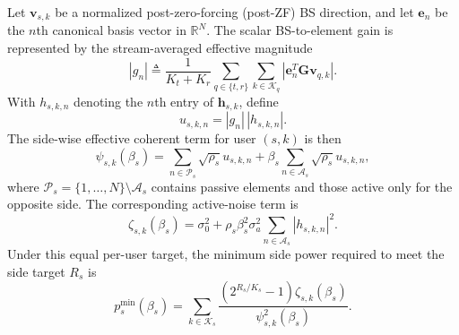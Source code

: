 \documentclass[journal]{IEEEtran}
\begin{document}
Let $\mathbf v_{s,k}$ be a normalized post-zero-forcing (post-ZF) BS direction, and let $\mathbf e_n$ be the $n$th canonical basis vector in $\mathbb{R}^N$. The scalar BS-to-element gain is represented by the stream-averaged effective magnitude
\[
|g_n|\triangleq \frac{1}{K_t+K_r}\sum_{q\in\{t,r\}}\sum_{k\in\mathcal{K}_q}\left|\mathbf e_n^T\mathbf{G}\mathbf v_{q,k}\right|.
\]
With $h_{s,k,n}$ denoting the $n$th entry of $\mathbf{h}_{s,k}$, define
\begin{equation}
u_{s,k,n} = |g_n|\,|h_{s,k,n}|.
\label{eq:un}
\end{equation}
The side-wise effective coherent term for user $(s,k)$ is then
\begin{equation}
\psi_{s,k}(\beta_s)=
\sum_{n\in\mathcal{P}_s}\sqrt{\rho_s}u_{s,k,n}
+\beta_s\sum_{n\in\mathcal{A}_s}\sqrt{\rho_s}u_{s,k,n},
\label{eq:psi}
\end{equation}
where $\mathcal{P}_s=\{1,\ldots,N\}\setminus\mathcal{A}_s$ contains passive elements and those active only for the opposite side. The corresponding active-noise term is
\begin{equation}
\zeta_{s,k}(\beta_s)=\sigma_0^2+
\rho_s\beta_s^2\sigma_a^2
\sum_{n\in\mathcal{A}_s}|h_{s,k,n}|^2.
\label{eq:noise_exact}
\end{equation}
Under this equal per-user target, the minimum side power required to meet the side target $R_s$ is
\begin{equation}
p_s^{\min}(\beta_s)=
\sum_{k\in\mathcal{K}_s}
\frac{(2^{R_s/K_s}-1)\zeta_{s,k}(\beta_s)}{\psi_{s,k}^2(\beta_s)}.
\label{eq:minsidepower}
\end{equation}
\end{document}
